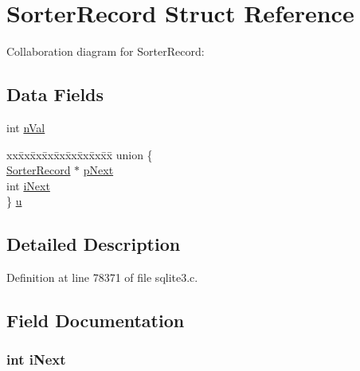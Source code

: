 \hypertarget{struct_sorter_record}{}\section{Sorter\+Record Struct Reference}
\label{struct_sorter_record}


Collaboration diagram for Sorter\+Record\+:
\subsection*{Data Fields}
\begin{DoxyCompactItemize}
\item 
int \hyperlink{struct_sorter_record_aedf5d5812ebc9169ea4ddf3f5844ba6b}{n\+Val}
\item 
\begin{tabbing}
xx\=xx\=xx\=xx\=xx\=xx\=xx\=xx\=xx\=\kill
union \{\\
\>\hyperlink{struct_sorter_record}{SorterRecord} $\ast$ \hyperlink{struct_sorter_record_a22f9a3bef827a94e99ef770d1d1a3461}{pNext}\\
\>int \hyperlink{struct_sorter_record_a7055b113747e55de4bbbf2e0acea4c9f}{iNext}\\
\} \hyperlink{struct_sorter_record_a593e76f03f25f7d7b873858edd561286}{u}\\

\end{tabbing}\end{DoxyCompactItemize}


\subsection{Detailed Description}


Definition at line 78371 of file sqlite3.\+c.



\subsection{Field Documentation}
\hypertarget{struct_sorter_record_a7055b113747e55de4bbbf2e0acea4c9f}{}
\subsubsection[{i\+Next}]{\setlength{\rightskip}{0pt plus 5cm}int i\+Next}\label{struct_sorter_record_a7055b113747e55de4bbbf2e0acea4c9f}


